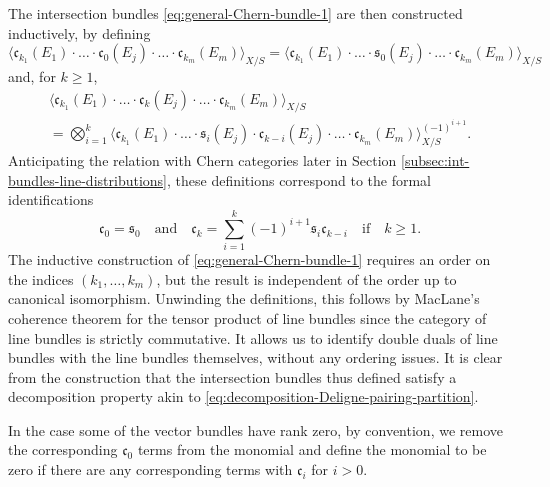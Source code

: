 \documentclass[JEP,XML,SOM,Unicode,published]{cedram}
\theoremstyle{plain}
\theoremstyle{definition}
\newcommand{\cfrak}{\mathfrak c}
\newcommand{\sfrak}{\mathfrak s}
\begin{document}
The intersection bundles \eqref{eq:general-Chern-bundle-1} are then constructed inductively, by defining\vspace*{-3pt}
\begin{displaymath}
\langle \cfrak_{k_1}(E_1) \cdot \ldots \cdot \cfrak_0(E_j) \cdot \ldots \cdot \cfrak_{k_m}(E_m) \rangle_{X/S} = \langle \cfrak_{k_1}(E_1) \cdot \ldots \cdot \sfrak_0(E_j) \cdot \ldots \cdot \cfrak_{k_m}(E_m) \rangle_{X/S}
\end{displaymath}
and, for $k \geq 1$,\vspace*{-5pt}
\begin{multline*}
\langle \cfrak_{k_1}(E_1) \cdot \ldots \cdot \cfrak_k(E_j) \cdot \ldots \cdot \cfrak_{k_m}(E_m) \rangle_{X/S}\\[-3pt]
= \bigotimes_{i=1}^{k} \langle \cfrak_{k_1}(E_1) \cdot \ldots \cdot \sfrak_i(E_j) \cdot \cfrak_{k-i}(E_j) \cdot \ldots \cdot \cfrak_{k_m}(E_m) \rangle_{X/S}^{(-1)^{i+1}}.
\end{multline*}
Anticipating the relation with Chern categories later in Section \ref{subsec:int-bundles-line-distributions}, these definitions correspond to the formal identifications\vspace*{-3pt}
\begin{equation}\label{eq:definition-chern-classes}
\cfrak_0=\sfrak_0 \quad\text{and}\quad \cfrak_k = \sum_{i=1}^{k} (-1)^{i+1} \sfrak_i \cfrak_{k-i}\quad\text{if}\quad k\geq 1.
\end{equation}
The inductive construction of \eqref{eq:general-Chern-bundle-1} requires an order on the indices $(k_{1},\ldots, k_{m})$, but the result is independent of the order up to canonical isomorphism. Unwinding the definitions, this follows by MacLane's coherence theorem for the tensor product of line bundles since the category of line bundles is strictly commutative. It allows us to identify double duals of line bundles with the line bundles themselves, without any ordering issues.
It is clear from the construction that the intersection bundles thus defined satisfy a decomposition property akin to \eqref{eq:decomposition-Deligne-pairing-partition}.

In the case some of the vector bundles have rank zero, by convention, we remove the corresponding $\cfrak_0$ terms from the monomial and define the monomial to be zero if there are any corresponding terms with $\cfrak_i$ for $i > 0$.
\end{document}

